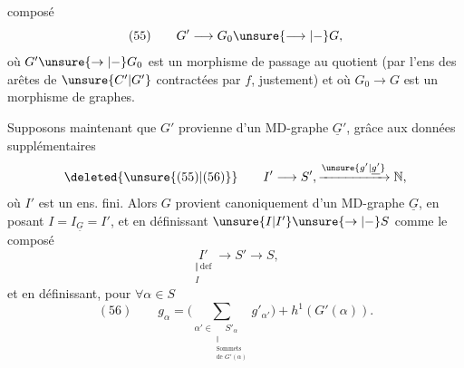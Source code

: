 composé
\[
(55)\qquad G'\longrightarrow G_0\unsure{\longrightarrow|{-}}G,
\]
où $G'\unsure{\to|{-}}G_0$ est un morphisme de passage au quotient (par l'ens des arêtes de $\unsure{C'|G'}$ contractées par $f$, justement) et où $G_0\longrightarrow G$ est un morphisme  de graphes.

Supposons maintenant que $G'$   provienne  d'un MD-graphe $\underline G'$, grâce aux données supplémentaires
\[
\deleted{\unsure{(55)|(56)}}\qquad I'\longrightarrow S',\xrightarrow{\unsure{g'|\underline{g'}}}\mathbb N,
\]
où $I'$ est un ens. fini. Alors $G$ provient canoniquement d'un MD-graphe $\underline G$, en posant $I=I_{\underline G}=I'$, et en définissant $\unsure{I|I'}\unsure{\to|{-}}S$ comme le composé
\[
\underset{\substack{\Vert\,\mathrm{def}\\I}}{I'}\longrightarrow S'\longrightarrow S,
\]
et en définissant, pour $\forall\alpha\in S$
\[
(56)\qquad g_\alpha=\Big(\sum_{\alpha'\in\underset{\substack{\Vert\\\text{Sommets}\\\text{de }G'(\alpha)}}{S'_\alpha}}g'_{\alpha'}\Big)+h^1(G'(\alpha)).
\]
